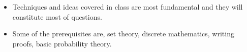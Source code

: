 \documentclass[twocolumn]{article}
\begin{document}
\begin{itemize}
\item Techniques and ideas covered in class are most fundamental and
  they will constitute most of questions.
\item Some of the prerequisites are, set theory, discrete mathematics,
  writing proofs, basic probability theory.
\end{itemize}
\end{document}
